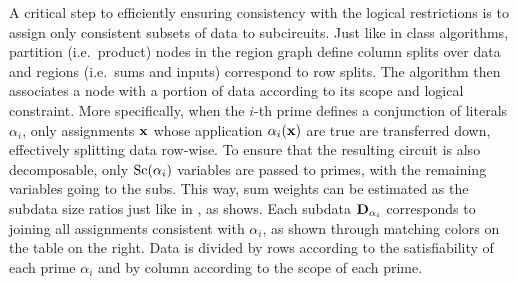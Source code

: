 A critical step to efficiently ensuring consistency with the logical restrictions is to assign only
consistent subsets of data to subcircuits. Just like in \divclass{} class algorithms, partition
(i.e.\ product) nodes in the region graph define column splits over data and regions (i.e.\ sums
and inputs) correspond to row splits. The algorithm then associates a node with a portion of data
according to its scope and logical constraint. More specifically, when the $i$-th prime defines a
conjunction of literals $\alpha_i$, only assignments $\mathbf{x}$ whose application
$\alpha_i(\mathbf{x})$ are true are transferred down, effectively splitting data row-wise. To ensure
that the resulting circuit is also decomposable, only $\operatorname*{\normalfont{Sc}}(\alpha_i)$ variables are passed to
primes, with the remaining variables going to the subs. This way, sum weights can be estimated as
the subdata size ratios just like in , as  shows. Each subdata
$\mathbf{D}_{\alpha_i}$ corresponds to joining all assignments consistent with $\alpha_i$, as shown
through matching colors on the table on the right. Data is divided by rows according to the
satisfiability of each prime $\alpha_i$ and by column according to the scope of each prime.

